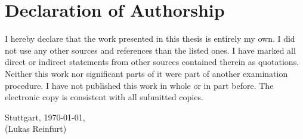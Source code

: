 \chapter*{Declaration of Authorship}

\noindent
I hereby declare that the work presented in this thesis is entirely my own.
I did not use any other sources and references than the listed ones.
I have marked all direct or indirect statements from other sources contained therein as quotations.
Neither this work nor significant parts of it were part of another examination procedure.
I have not published this work in whole or in part before.
The electronic copy is consistent with all submitted copies.

\vspace{4em}

\noindent
Stuttgart, \today,\hspace{4em}\hdashrule[0.5ex][x]{8.5cm}{1pt}{1pt}\\
\phantom{Stuttgart, \today,}\hspace{4em}(Lukas Reinfurt)
